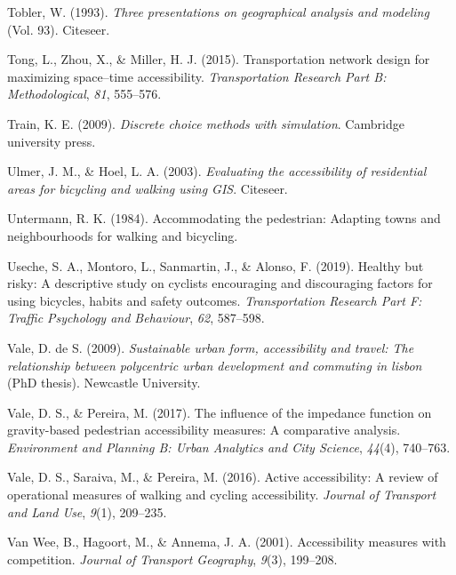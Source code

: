 \documentclass[
11pt, %
oneside, %
english, %
singlespacing, %
]{macthesis} %
\newlength{\cslhangindent}
\newenvironment{CSLReferences}[2] %
 {%
  \setlength{\parindent}{0pt}
  \ifodd #1 \everypar{\setlength{\hangindent}{\cslhangindent}}\ignorespaces\fi
  \ifnum #2 > 0
  \setlength{\parskip}{#2\baselineskip}
  \fi
 }%
 {}
\begin{document}
\begin{CSLReferences}{1}{0}
\leavevmode{}%
Tobler, W. (1993). \emph{Three presentations on geographical analysis and modeling} (Vol. 93). Citeseer.

\leavevmode{}%
Tong, L., Zhou, X., \& Miller, H. J. (2015). Transportation network design for maximizing space--time accessibility. \emph{Transportation Research Part B: Methodological}, \emph{81}, 555--576.

\leavevmode{}%
Train, K. E. (2009). \emph{Discrete choice methods with simulation}. Cambridge university press.

\leavevmode{}%
Ulmer, J. M., \& Hoel, L. A. (2003). \emph{Evaluating the accessibility of residential areas for bicycling and walking using GIS}. Citeseer.

\leavevmode{}%
Untermann, R. K. (1984). Accommodating the pedestrian: Adapting towns and neighbourhoods for walking and bicycling.

\leavevmode{}%
Useche, S. A., Montoro, L., Sanmartin, J., \& Alonso, F. (2019). Healthy but risky: A descriptive study on cyclists encouraging and discouraging factors for using bicycles, habits and safety outcomes. \emph{Transportation Research Part F: Traffic Psychology and Behaviour}, \emph{62}, 587--598.

\leavevmode{}%
Vale, D. de S. (2009). \emph{Sustainable urban form, accessibility and travel: The relationship between polycentric urban development and commuting in lisbon} (PhD thesis). Newcastle University.

\leavevmode{}%
Vale, D. S., \& Pereira, M. (2017). The influence of the impedance function on gravity-based pedestrian accessibility measures: A comparative analysis. \emph{Environment and Planning B: Urban Analytics and City Science}, \emph{44}(4), 740--763.

\leavevmode{}%
Vale, D. S., Saraiva, M., \& Pereira, M. (2016). Active accessibility: A review of operational measures of walking and cycling accessibility. \emph{Journal of Transport and Land Use}, \emph{9}(1), 209--235.

\leavevmode{}%
Van Wee, B., Hagoort, M., \& Annema, J. A. (2001). Accessibility measures with competition. \emph{Journal of Transport Geography}, \emph{9}(3), 199--208.


\end{CSLReferences}
\end{document}
